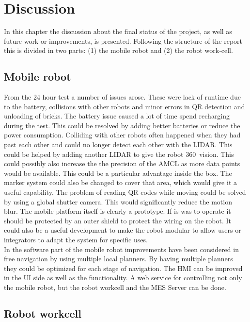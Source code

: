 \chapter{Discussion}
\label{chap:discussion}
In this chapter the discussion about the final status of the project, as well as future work or improvements, is presented.
Following the structure of the report this is divided in two parts: (1) the mobile robot and (2) the robot work-cell.

	\section{Mobile robot} %
	\label{sub:mobile_robot}
	From the 24 hour test a number of issues arose. These were lack of runtime due to the battery, collisions with other robots and minor errors in QR detection and unloading of bricks. 
	The battery issue caused a lot of time spend recharging during the test. This could be resolved by adding better batteries or reduce the power consumption.
	Colliding with other robots often happened when they had past each other and could no longer detect each other with the LIDAR. 
	This could be helped by adding another LIDAR to give the robot 360\degree \ vision. 
	This could possibly also increase the the precision of the AMCL as more data points would be available. This could be a particular advantage inside the box. The marker system could also be changed to cover that area, which would give it a useful capability. 
	The problem of reading QR codes while moving could be solved by using a global shutter camera. This would significantly reduce the motion blur. 
	The mobile platform itself is clearly a prototype. If is was to operate it should be protected by an outer shield to protect the wiring on the robot. It could also be a useful development to make the robot modular to allow users or integrators to adapt the system for specific uses. \\
	
In the software part of the mobile robot improvements have been considered in free navigation by using multiple local planners. By having multiple planners they could be optimized for each stage of navigation. The HMI can be improved in the UI side as well as the functionality. A web service for controlling not only the mobile robot, but the robot workcell and the MES Server can be done.

	\section{Robot workcell} %
	\label{sub:robot_workcell}
	
